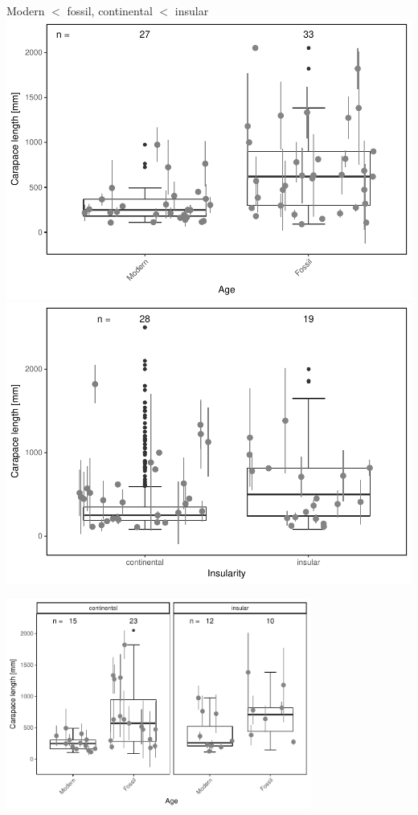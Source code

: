 \begin{frame}{Modern $<$ fossil, continental $<$ insular}
\includegraphics[scale=0.3]{MA_JJ_files/figure-latex/BPMF-1.pdf}
\includegraphics[scale=0.3]{MA_JJ_files/figure-latex/BPCI-1.pdf}


\end{frame}


\begin{frame}
\begin{center}
	\includegraphics[width=0.75\textwidth]{MA_JJ_files/figure-latex/BPFMCI-1.pdf}
\end{center}

\end{frame}

